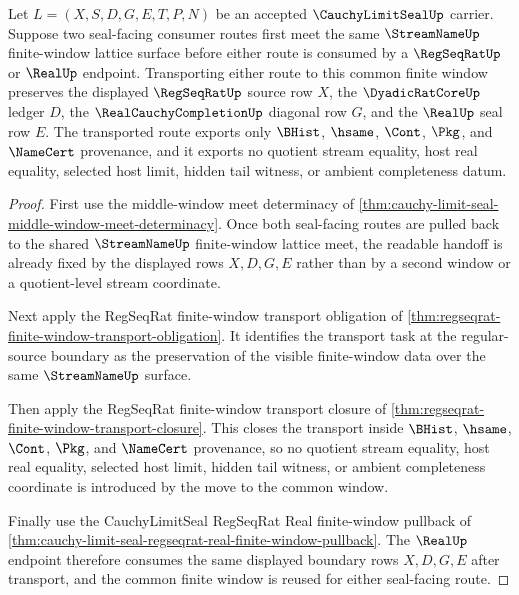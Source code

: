 \begin{theorem}
\label{thm:cauchy-limit-seal-common-window-transport}
Let $L=(X,S,D,G,E,T,P,N)$ be an accepted $\CauchyLimitSealUp$ carrier. Suppose two seal-facing consumer routes first meet the same $\StreamNameUp$ finite-window lattice surface before either route is consumed by a $\RegSeqRatUp$ or $\RealUp$ endpoint. Transporting either route to this common finite window preserves the displayed $\RegSeqRatUp$ source row $X$, the $\DyadicRatCoreUp$ ledger $D$, the $\RealCauchyCompletionUp$ diagonal row $G$, and the $\RealUp$ seal row $E$. The transported route exports only $\BHist$, $\hsame$, $\Cont$, $\Pkg$, and $\NameCert$ provenance, and it exports no quotient stream equality, host real equality, selected host limit, hidden tail witness, or ambient completeness datum.
\end{theorem}
\begin{proof}
First use the middle-window meet determinacy of \autoref{thm:cauchy-limit-seal-middle-window-meet-determinacy}. Once both seal-facing routes are pulled back to the shared $\StreamNameUp$ finite-window lattice meet, the readable handoff is already fixed by the displayed rows $X,D,G,E$ rather than by a second window or a quotient-level stream coordinate.

Next apply the RegSeqRat finite-window transport obligation of \autoref{thm:regseqrat-finite-window-transport-obligation}. It identifies the transport task at the regular-source boundary as the preservation of the visible finite-window data over the same $\StreamNameUp$ surface.

Then apply the RegSeqRat finite-window transport closure of \autoref{thm:regseqrat-finite-window-transport-closure}. This closes the transport inside $\BHist$, $\hsame$, $\Cont$, $\Pkg$, and $\NameCert$ provenance, so no quotient stream equality, host real equality, selected host limit, hidden tail witness, or ambient completeness coordinate is introduced by the move to the common window.

Finally use the CauchyLimitSeal RegSeqRat Real finite-window pullback of \autoref{thm:cauchy-limit-seal-regseqrat-real-finite-window-pullback}. The $\RealUp$ endpoint therefore consumes the same displayed boundary rows $X,D,G,E$ after transport, and the common finite window is reused for either seal-facing route.
\end{proof}

